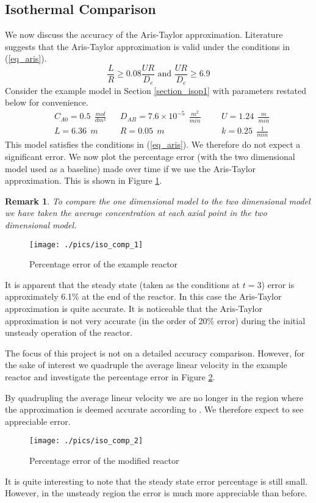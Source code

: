 \documentclass[11pt,fleqn]{article}
\theoremstyle{defstyle}
\newtheorem{rmrk}{Remark}[section]
\begin{document}
\subsection{Isothermal Comparison}
We now discuss the accuracy of the Aris-Taylor approximation. Literature \cite{washington} suggests that the Aris-Taylor approximation is valid under the conditions in (\ref{eq_aris}).
\begin{equation}
\frac{L}{R} \geq 0.08\frac{UR}{D_e} \text{ and } \frac{UR}{D_e} \geq 6.9
\label{eq_aris}
\end{equation}
Consider the example model in Section \ref{section_isop1} with parameters restated below for convenience.
\begin{equation*}
\begin{aligned}
&C_{A0} = 0.5~~ \frac{mol}{dm^3}
&&D_{AB} = 7.6\times 10^{-5} ~~\frac{m^2}{min}
&&&U = 1.24~~ \frac{m}{min} \\
&L = 6.36~~ m 
&&R = 0.05~~ m
&&&k = 0.25~~ \frac{1}{min} 
\end{aligned}
\end{equation*}
This model satisfies the conditions in (\ref{eq_aris}). We therefore do not expect a significant error. We now plot the percentage error (with the two dimensional model used as a baseline) made over time if we use the Aris-Taylor approximation. This is shown in Figure \ref{fig_isocomp1}.
\begin{rmrk}
To compare the one dimensional model to the two dimensional model we have taken the average concentration at each axial point in the two dimensional model.
\end{rmrk}
\begin{figure}[H] 
\centering
\texttt{[image: ./pics/iso\_comp\_1]}
\caption{Percentage error of the example reactor} 
\label{fig_isocomp1}
\end{figure}
It is apparent that the steady state (taken as the conditions at $t=3$) error is approximately 6.1\% at the end of the reactor. In this case the Aris-Taylor approximation is quite accurate. It is noticeable that the Aris-Taylor approximation is not very accurate (in the order of 20\% error) during the initial unsteady operation of the reactor. 

The focus of this project is not on a detailed accuracy comparison. However, for the sake of interest we quadruple the average linear velocity in the example reactor and investigate the percentage error in Figure \ref{fig_isocomp2}.

By quadrupling the average linear velocity we are no longer in the region where the approximation is deemed accurate according to \cite{washington}. We therefore expect to see appreciable error. 
\begin{figure}[H] 
\centering
\texttt{[image: ./pics/iso\_comp\_2]}
\caption{Percentage error of the modified reactor} 
\label{fig_isocomp2}
\end{figure}
It is quite interesting to note that the steady state error percentage is still small. However, in the unsteady region the error is much more appreciable than before. 
\end{document}
